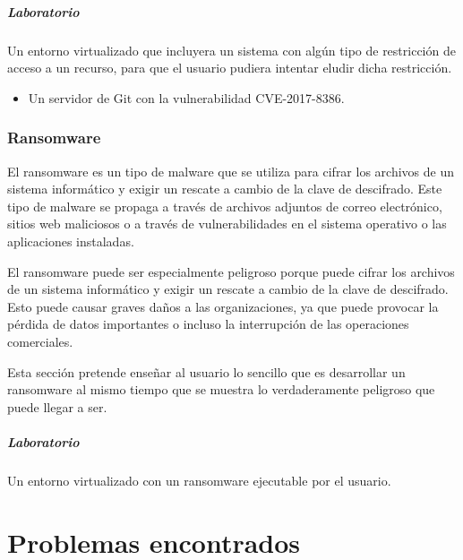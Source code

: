             \paragraph{Laboratorio}

                Un entorno virtualizado que incluyera un sistema con algún tipo de restricción de acceso a un recurso, para que el usuario pudiera intentar eludir dicha restricción.

                \begin{itemize}
                    \item Un servidor de Git con la vulnerabilidad CVE-2017-8386.
                \end{itemize}


        \subsection{Ransomware}
        
            El ransomware es un tipo de malware que se utiliza para cifrar los archivos de un sistema informático y exigir un rescate a cambio de la clave de descifrado. Este tipo de malware se propaga a través de archivos adjuntos de correo electrónico, sitios web maliciosos o a través de vulnerabilidades en el sistema operativo o las aplicaciones instaladas.
            
            El ransomware puede ser especialmente peligroso porque puede cifrar los archivos de un sistema informático y exigir un rescate a cambio de la clave de descifrado. Esto puede causar graves daños a las organizaciones, ya que puede provocar la pérdida de datos importantes o incluso la interrupción de las operaciones comerciales.

            Esta sección pretende enseñar al usuario lo sencillo que es desarrollar un ransomware al mismo tiempo que se muestra lo verdaderamente peligroso que puede llegar a ser.
            
            \paragraph{Laboratorio}
            
                Un entorno virtualizado con un ransomware ejecutable por el usuario.
        
        \cleardoublepage


\chapter{Problemas encontrados}

